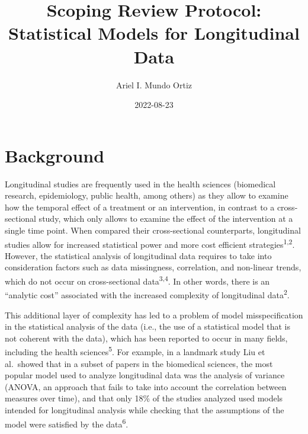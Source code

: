 \documentclass[
]{article}
\title{Scoping Review Protocol: Statistical Models for Longitudinal
Data}
\author{Ariel I. Mundo Ortiz}
\date{2022-08-23}
\renewcommand*\contentsname{Table of contents}
\newcommand\contentsname{Table of contents}
\begin{document}
\maketitle
\ifdefined\Shaded\renewenvironment{Shaded}{\begin{tcolorbox}[interior hidden, borderline west={3pt}{0pt}{shadecolor}, breakable, sharp corners, enhanced, frame hidden, boxrule=0pt]}{\end{tcolorbox}}\fi

\renewcommand*\contentsname{Table of contents}
{
\hypersetup{linkcolor=}
\setcounter{tocdepth}{3}
\tableofcontents
}
\hypertarget{background}{%
\section{Background}\label{background}}

Longitudinal studies are frequently used in the health sciences
(biomedical research, epidemiology, public health, among others) as they
allow to examine how the temporal effect of a treatment or an
intervention, in contrast to a cross-sectional study, which only allows
to examine the effect of the intervention at a single time point. When
compared their cross-sectional counterparts, longitudinal studies allow
for increased statistical power and more cost efficient
strategies\textsuperscript{1,2}. However, the statistical analysis of
longitudinal data requires to take into consideration factors such as
data missingness, correlation, and non-linear trends, which do not occur
on cross-sectional data\textsuperscript{3,4}. In other words, there is
an ``analytic cost'' associated with the increased complexity of
longitudinal data\textsuperscript{2}.

This additional layer of complexity has led to a problem of model
misspecification in the statistical analysis of the data (i.e., the use
of a statistical model that is not coherent with the data), which has
been reported to occur in many fields, including the health
sciences\textsuperscript{5}. For example, in a landmark study Liu et
al.~showed that in a subset of papers in the biomedical sciences, the
most popular model used to analyze longitudinal data was the analysis of
variance (ANOVA, an approach that fails to take into account the
correlation between measures over time), and that only 18\% of the
studies analyzed used models intended for longitudinal analysis while
checking that the assumptions of the model were satisfied by the
data\textsuperscript{6}.
\end{document}

